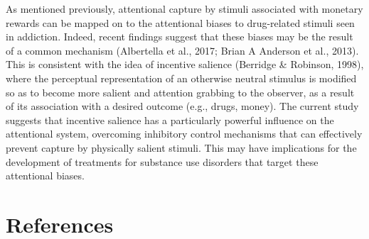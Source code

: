 \documentclass[jou, a4paper, noextraspace,floatsintext]{apa6}
\theoremstyle{definition}
\theoremstyle{definition}
\theoremstyle{definition}
\theoremstyle{remark}
\begin{document}
As mentioned previously, attentional capture by stimuli associated with
monetary rewards can be mapped on to the attentional biases to
drug-related stimuli seen in addiction. Indeed, recent findings suggest
that these biases may be the result of a common mechanism (Albertella et
al., 2017; Brian A Anderson et al., 2013). This is consistent with the
idea of incentive salience (Berridge \& Robinson, 1998), where the
perceptual representation of an otherwise neutral stimulus is modified
so as to become more salient and attention grabbing to the observer, as
a result of its association with a desired outcome (e.g., drugs, money).
The current study suggests that incentive salience has a particularly
powerful influence on the attentional system, overcoming inhibitory
control mechanisms that can effectively prevent capture by physically
salient stimuli. This may have implications for the development of
treatments for substance use disorders that target these attentional
biases.



























































\newpage

\section{References}\label{references}

\begingroup
\setlength{\parindent}{-0.5in} \setlength{\leftskip}{0.5in}
\end{document}
